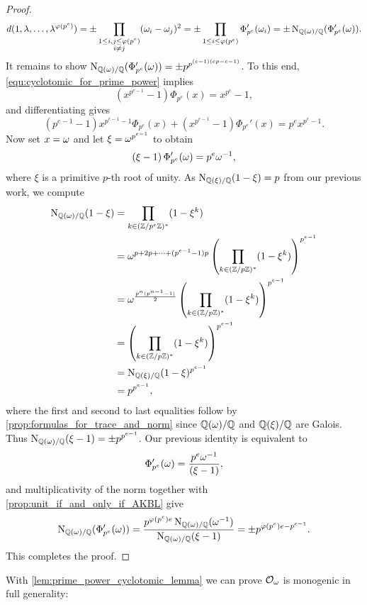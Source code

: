 \begin{proof}
      \[
        d(1,\lambda,\ldots,\lambda^{\varphi(p^{e})}) = \pm\prod_{\substack{1 \le i,j \le \varphi(p^{e}) \\ i \neq j}}(\omega_{i}-\omega_{j})^{2} = \pm\prod_{1 \le i \le \varphi(p^{e})}\Phi_{p^{e}}'(\omega_{i}) = \pm\operatorname{\mathrm{N}}_{\mathbb{Q}(\omega)/\mathbb{Q}}(\Phi_{p^{e}}'(\omega)).
      \]
      It remains to show $\operatorname{\mathrm{N}}_{\mathbb{Q}(\omega)/\mathbb{Q}}(\Phi_{p^{e}}'(\omega)) = \pm p^{p^{(e-1)(ep-e-1)}}$. To this end, \cref{equ:cyclotomic_for_prime_power} implies
      \[
        (x^{p^{e-1}}-1)\Phi_{p^{e}}(x) = x^{p^{e}}-1,
      \]
      and differentiating gives
      \[
        \left(p^{e-1}-1\right)x^{p^{e-1}-1}\Phi_{p^{e}}(x)+\left(x^{p^{e-1}}-1\right)\Phi_{p^{e}}'(x) = p^{e}x^{p^{e}-1}.
      \]
      Now set $x = \omega$ and let $\xi = \omega^{p^{e-1}}$ to obtain
      \[
        \left(\xi-1\right)\Phi_{p^{e}}'(\omega) = p^{e}\omega^{-1},
      \]
      where $\xi$ is a primitive $p$-th root of unity. As $\operatorname{\mathrm{N}}_{\mathbb{Q}(\xi)/\mathbb{Q}}(1-\xi) = p$ from our previous work, we compute
      \begin{align*}
        \operatorname{\mathrm{N}}_{\mathbb{Q}(\omega)/\mathbb{Q}}(1-\xi) &= \prod_{k \in (\mathbb{Z}/p^{e}\mathbb{Z})^{\ast}}(1-\xi^{k}) \\
        &= \omega^{p+2p+\cdots+(p^{e-1}-1)p}\left(\prod_{k \in (\mathbb{Z}/p\mathbb{Z})^{\ast}}(1-\xi^{k})\right)^{p^{e-1}} \\
        &= \omega^{\frac{p^{n}(p^{n-1}-1)}{2}}\left(\prod_{k \in (\mathbb{Z}/p\mathbb{Z})^{\ast}}(1-\xi^{k})\right)^{p^{e-1}} \\
        &= \left(\prod_{k \in (\mathbb{Z}/p\mathbb{Z})^{\ast}}(1-\xi^{k})\right)^{p^{e-1}} \\
        &= \operatorname{\mathrm{N}}_{\mathbb{Q}(\xi)/\mathbb{Q}}(1-\xi)^{p^{e-1}} \\
        &= p^{p^{e-1}},
      \end{align*}
      where the first and second to last equalities follow by \cref{prop:formulas_for_trace_and_norm} since $\mathbb{Q}(\omega)/\mathbb{Q}$ and $\mathbb{Q}(\xi)/\mathbb{Q}$ are Galois. Thus $\operatorname{\mathrm{N}}_{\mathbb{Q}(\omega)/\mathbb{Q}}(\xi-1) = \pm p^{p^{e-1}}$. Our previous identity is equivalent to
      \[
        \Phi_{p^{e}}'(\omega) = \frac{p^{e}\omega^{-1}}{\left(\xi-1\right)},
      \]
      and multiplicativity of the norm together with \cref{prop:unit_if_and_only_if_AKBL} give
      \[
        \operatorname{\mathrm{N}}_{\mathbb{Q}(\omega)/\mathbb{Q}}(\Phi_{p^{e}}'(\omega)) = \frac{p^{\varphi(p^{e})e}\operatorname{\mathrm{N}}_{\mathbb{Q}(\omega)/\mathbb{Q}}(\omega^{-1})}{\operatorname{\mathrm{N}}_{\mathbb{Q}(\omega)/\mathbb{Q}}(\xi-1)} = \pm p^{\varphi(p^{e})e-p^{e-1}}.
      \]
      This completes the proof.
    \end{proof}

    With \cref{lem:prime_power_cyclotomic_lemma} we can prove $\mathcal{O}_{\omega}$ is monogenic in full generality:

